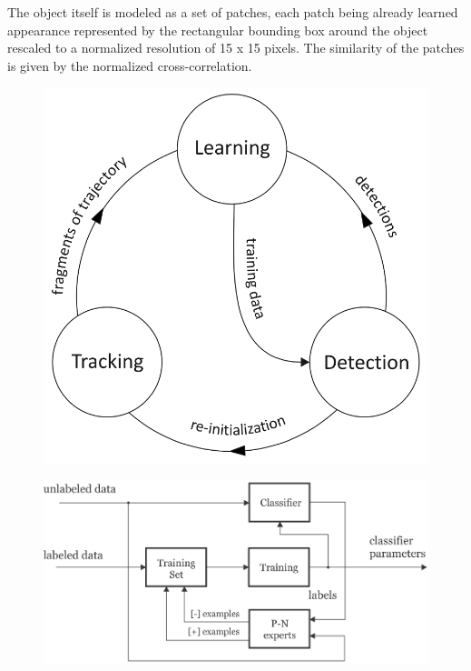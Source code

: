The object itself is modeled as a set of patches, each patch being already learned appearance represented by the rectangular bounding box around the object rescaled to a normalized resolution of 15 x 15 pixels. The similarity of the patches is given by the normalized cross-correlation.

\begin{figure}[htb]
	\centering
	\begin{minipage}{.34\textwidth}
		\centering
		\includegraphics[width=.99\linewidth]{fig/tld_block_diagram.png}
		\label{fig:tld_block_diagram}
	\end{minipage}
	\hfill
	\begin{minipage}{.63\textwidth}
		\centering
		\includegraphics[width=.99\linewidth]{fig/tld_pn_learning_block_diagram.png}
		\label{fig:tld_pn_learning_block_diagram}
	\end{minipage}
\end{figure}

